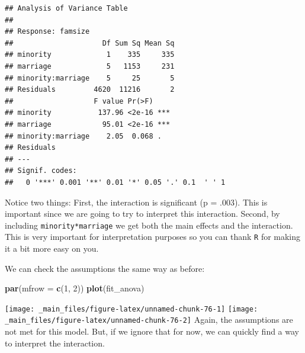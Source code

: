 \documentclass[]{tufte-book}
\newenvironment{Shaded}{}{}
\newcommand{\KeywordTok}[1]{\textcolor[rgb]{0.00,0.44,0.13}{\textbf{#1}}}
\newcommand{\DataTypeTok}[1]{\textcolor[rgb]{0.56,0.13,0.00}{#1}}
\newcommand{\DecValTok}[1]{\textcolor[rgb]{0.25,0.63,0.44}{#1}}
\newcommand{\StringTok}[1]{\textcolor[rgb]{0.25,0.44,0.63}{#1}}
\newcommand{\OperatorTok}[1]{\textcolor[rgb]{0.40,0.40,0.40}{#1}}
\newcommand{\NormalTok}[1]{#1}
\theoremstyle{definition}
\theoremstyle{definition}
\theoremstyle{remark}
\begin{document}
\begin{Shaded}
\end{Shaded}

\begin{verbatim}
## Analysis of Variance Table
## 
## Response: famsize
##                     Df Sum Sq Mean Sq
## minority             1    335     335
## marriage             5   1153     231
## minority:marriage    5     25       5
## Residuals         4620  11216       2
##                   F value Pr(>F)    
## minority           137.96 <2e-16 ***
## marriage            95.01 <2e-16 ***
## minority:marriage    2.05  0.068 .  
## Residuals                           
## ---
## Signif. codes:  
##   0 '***' 0.001 '**' 0.01 '*' 0.05 '.' 0.1  ' ' 1
\end{verbatim}

Notice two things: First, the interaction is significant (p = .003).
This is important since we are going to try to interpret this
interaction. Second, by including \texttt{minority*marriage} we get both
the main effects and the interaction. This is very important for
interpretation purposes so you can thank \texttt{R} for making it a bit
more easy on you.

We can check the assumptions the same way as before:

\begin{Shaded}
\begin{Highlighting}[]
\KeywordTok{par}\NormalTok{(}\DataTypeTok{mfrow =} \KeywordTok{c}\NormalTok{(}\DecValTok{1}\NormalTok{, }\DecValTok{2}\NormalTok{))}
\KeywordTok{plot}\NormalTok{(fit_anova)}
\end{Highlighting}
\end{Shaded}

\texttt{[image: \_main\_files/figure-latex/unnamed-chunk-76-1]}
\texttt{[image: \_main\_files/figure-latex/unnamed-chunk-76-2]} Again, the
assumptions are not met for this model. But, if we ignore that for now,
we can quickly find a way to interpret the interaction.
\end{document}
